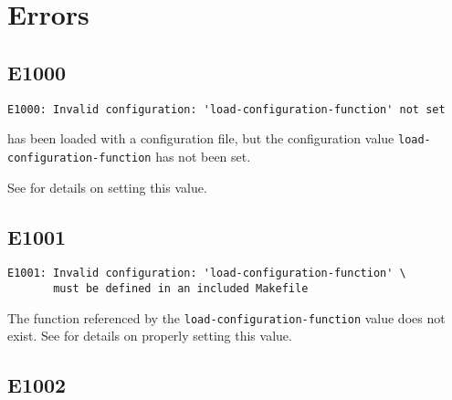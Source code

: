 %
%
%
%
\chapter{Errors}

\section{E1000}

\begin{footnotesize}
\begin{verbatim}
E1000: Invalid configuration: 'load-configuration-function' not set
\end{verbatim}
\end{footnotesize}

\lmsbw has been loaded with a configuration file, but the
configuration value \texttt{load-configuration-function} has not been
set.

See  for details on
setting this value.

\section{E1001}

\begin{footnotesize}
\begin{verbatim}
E1001: Invalid configuration: 'load-configuration-function' \
       must be defined in an included Makefile
\end{verbatim}
\end{footnotesize}

The function referenced by the \texttt{load-configuration-function}
value does not exist.  See
 for details on properly
setting this value.

\section{E1002}

